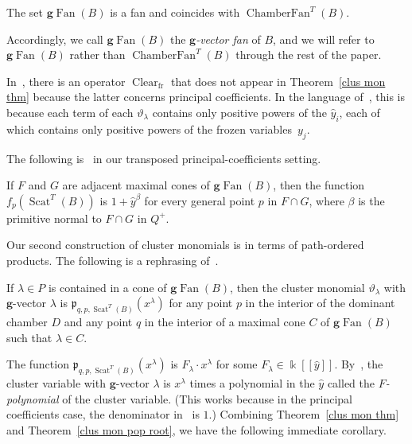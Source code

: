 \documentclass[ALCO,ThmDefs,Unicode,epreuves]{cedram}
\DeclareMathOperator{\fr}{fr}
\DeclareMathOperator{\Scat}{Scat}
\DeclareMathOperator{\Fan}{Fan}
\DeclareMathOperator{\ChamberFan}{ChamberFan}
\DeclareMathOperator{\Clear}{Clear}
\newcommand{\gFan}{\g\!\Fan}
\newcommand{\newword}[1]{\emph{#1}}
\newcommand\llbracket{[\![}
\newcommand\rrbracket{]\!]}
\newcommand{\thet}{\vartheta}
\newcommand{\p}{{\mathfrak p}}
\newcommand{\g}{\mathbf{g}}
\renewcommand{\k}{\Bbbk}
\newcommand{\hy}{\hat{y}}
\begin{document}
\begin{coro}\label{cham g}
The set $\gFan(B)$ is a fan and coincides with $\ChamberFan^T(B)$.
\end{coro}

Accordingly, we call $\gFan(B)$ the \newword{$\g$-vector fan} of $B$, and we will refer to $\gFan(B)$ rather than $\ChamberFan^T(B)$ through the rest of the paper.

\begin{rema}\label{Clear fr}
In~\cite[Theorem~5.2]{scatfan}, there is an operator $\Clear_{\fr}$ that does not appear in Theorem~\ref{clus mon thm} because the latter concerns principal coefficients.
In the language of~\cite{scatfan}, this is because each term of each $\thet_\lambda$ contains only positive powers of the $\hy_i$, each of which contains only positive powers of the frozen variables~$y_j$.
\end{rema}

The following is~\cite[Theorem~4.6]{scatfan} in our transposed principal-coefficients setting.
\begin{theorem}\label{clus easy root}
If $F$ and $G$ are adjacent maximal cones of $\gFan(B)$, then the function $f_p(\Scat^T(B))$ is $1+\hy^{\beta}$ for every general point $p$ in $F\cap G$, where $\beta$ is the primitive normal to $F\cap G$ in $Q^+$.
\end{theorem}

Our second construction of cluster monomials is in terms of path-ordered products.
The following is a rephrasing of~\cite[Theorem~5.6]{scatfan}.

\begin{theorem}\label{clus mon pop root}
If $\lambda\in P$ is contained in a cone of $\gFan(B)$, then the cluster monomial $\thet_\lambda$ with $\g$-vector $\lambda$ is $\p_{q,p,\Scat^T(B)}(x^\lambda)$ for any point $p$ in the interior of the dominant chamber $D$ and any point $q$ in the interior of a maximal cone $C$ of $\gFan(B)$ such that $\lambda\in C$.
\end{theorem}

The function $\p_{q,p,\Scat^T(B)}(x^\lambda)$ is $F_\lambda\cdot x^\lambda$ for some $F_\lambda\in\k\llbracket \hy\rrbracket $.
By~\cite[Corollary~6.3]{ca4}, the cluster variable with $\g$-vector $\lambda$ is $x^\lambda$ times a polynomial in the $\hy$ called the \newword{$F$-polynomial} of the cluster variable.
(This works because in the principal coefficients case, the denominator in~\cite[(6.5)]{ca4} is $1$.)
Combining Theorem~\ref{clus mon thm} and Theorem~\ref{clus mon pop root}, we have the following immediate corollary.
\end{document}
